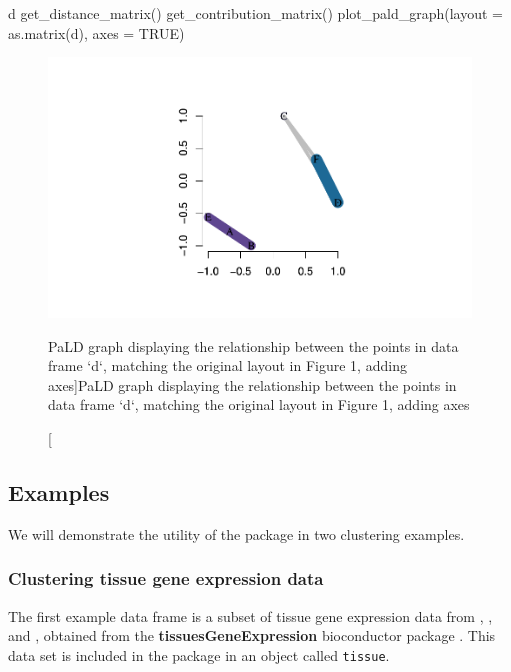 \begin{Schunk}
\begin{Sinput}
d %
  get_distance_matrix() %
  get_contribution_matrix() %
  plot_pald_graph(layout = as.matrix(d),
                  axes = TRUE)
\end{Sinput}
\begin{figure}
\includegraphics{manuscript_files/figure-latex/fig4-1} \caption[PaLD graph displaying the relationship between the points in data frame `d`, matching the original layout in Figure 1, adding axes]{PaLD graph displaying the relationship between the points in data frame `d`, matching the original layout in Figure 1, adding axes}\label{fig:fig4}
\end{figure}
\end{Schunk}

\hypertarget{examples}{%
\subsection{Examples}\label{examples}}

We will demonstrate the utility of the  package in two
clustering examples.

\hypertarget{clustering-tissue-gene-expression-data}{%
\subsubsection{Clustering tissue gene expression
data}\label{clustering-tissue-gene-expression-data}}

The first example data frame is a subset of tissue gene expression data
from \citet{zilliox2007gene}, \citet{mccall2011gene}, and
\citet{mccall2014gene}, obtained from the \textbf{tissuesGeneExpression}
bioconductor package \citep{tissue}. This data set is included in the
 package in an object called \texttt{tissue}.

